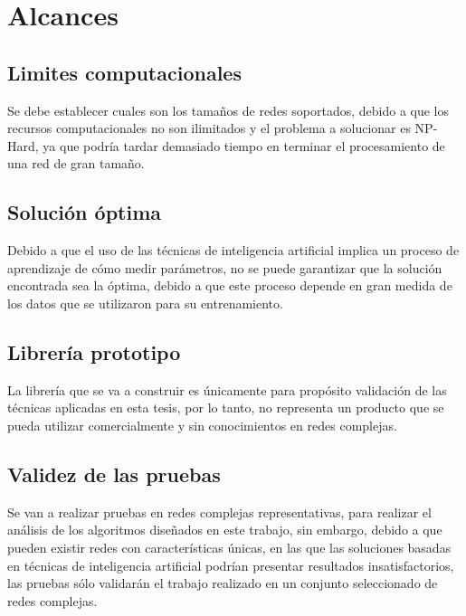 \section{Alcances}

\subsection{Limites computacionales}
Se debe establecer cuales son los tamaños de redes soportados, debido a que los recursos computacionales no son ilimitados y el problema a solucionar es NP-Hard, ya que podría tardar demasiado tiempo en terminar el procesamiento de una red de gran tamaño.

\subsection{Solución óptima}
Debido a que el uso de las técnicas de inteligencia artificial implica un proceso de aprendizaje de cómo medir parámetros, no se puede garantizar que la solución encontrada sea la
óptima, debido a que este proceso depende en gran medida de los datos que se utilizaron para
su entrenamiento.
\subsection{Librería prototipo}

La librería que se va a construir es únicamente para propósito validación de las técnicas aplicadas en esta tesis, por lo tanto, no representa un producto que se pueda utilizar comercialmente y sin conocimientos en redes complejas.
\subsection{Validez de las pruebas}

Se van a realizar pruebas en redes complejas representativas, para realizar el análisis de los algoritmos diseñados en este trabajo, sin embargo, debido a que pueden existir redes con características únicas, en las que las soluciones basadas en técnicas de inteligencia artificial podrían presentar resultados insatisfactorios, las pruebas sólo validarán el trabajo realizado en un conjunto seleccionado de redes complejas.
